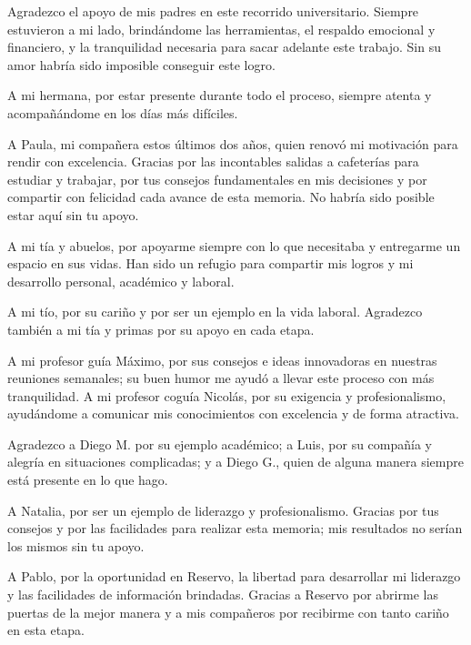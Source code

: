 \documentclass[
    spanish, %
    letterpaper, oneside
]{article}
\newenvironment{agradecimientos}{%
    \pagestyle{plain} %
    \sectionfont{\color{\sectioncolor} \sectionfontsize \sectionfontstyle \selectfont}%
    \sectionanumnoiheadless{Agradecimientos}%
    \thispagestyle{plain} %
}{%
}
\begin{document}
\newpage
\begin{agradecimientos}
Agradezco el apoyo de mis padres en este recorrido universitario. Siempre estuvieron a mi lado, brindándome las herramientas, el respaldo emocional y financiero, y la tranquilidad necesaria para sacar adelante este trabajo. Sin su amor habría sido imposible conseguir este logro.

A mi hermana, por estar presente durante todo el proceso, siempre atenta y acompañándome en los días más difíciles.

A Paula, mi compañera estos últimos dos años, quien renovó mi motivación para rendir con excelencia. Gracias por las incontables salidas a cafeterías para estudiar y trabajar, por tus consejos fundamentales en mis decisiones y por compartir con felicidad cada avance de esta memoria. No habría sido posible estar aquí sin tu apoyo.

A mi tía y abuelos, por apoyarme siempre con lo que necesitaba y entregarme un espacio en sus vidas. Han sido un refugio para compartir mis logros y mi desarrollo personal, académico y laboral.

A mi tío, por su cariño y por ser un ejemplo en la vida laboral. Agradezco también a mi tía y primas por su apoyo en cada etapa.

A mi profesor guía Máximo, por sus consejos e ideas innovadoras en nuestras reuniones semanales; su buen humor me ayudó a llevar este proceso con más tranquilidad. A mi profesor coguía Nicolás, por su exigencia y profesionalismo, ayudándome a comunicar mis conocimientos con excelencia y de forma atractiva.

Agradezco a Diego M. por su ejemplo académico; a Luis, por su compañía y alegría en situaciones complicadas; y a Diego G., quien de alguna manera siempre está presente en lo que hago.

A Natalia, por ser un ejemplo de liderazgo y profesionalismo. Gracias por tus consejos y por las facilidades para realizar esta memoria; mis resultados no serían los mismos sin tu apoyo.

A Pablo, por la oportunidad en Reservo, la libertad para desarrollar mi liderazgo y las facilidades de información brindadas. Gracias a Reservo por abrirme las puertas de la mejor manera y a mis compañeros por recibirme con tanto cariño en esta etapa.
\end{agradecimientos}


\newpage
\pagestyle{fancy} %


\templateIndex

\templateFinalcfg

 

\end{document}
